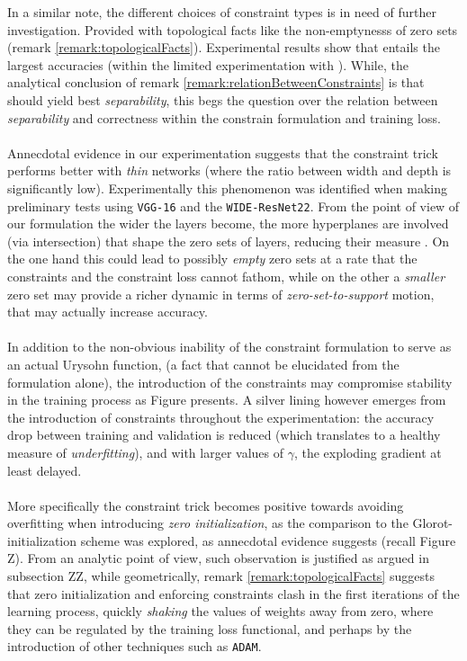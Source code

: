 In a similar note, the different choices of constraint types is in need of further investigation. Provided with topological facts like the non-emptynesss of zero sets (remark  \ref{remark:topologicalFacts}). Experimental results show that \ReLUL entails the largest accuracies (within the limited experimentation with \moons). While, the analytical conclusion of remark \ref{remark:relationBetweenConstraints} is that \ReLUU should yield best \emph{separability}, this begs the question over the relation between \emph{separability} and correctness within the constrain formulation and training loss.  
\\\\
Annecdotal evidence in our experimentation suggests that the constraint trick performs better with \emph{thin} networks (where the ratio between width and depth is significantly low). Experimentally this phenomenon was identified when making preliminary tests using \texttt{VGG-16} and the \texttt{WIDE-ResNet22}. From the point of view of our formulation the wider the layers become, the more hyperplanes are involved (via intersection) that shape the zero sets of layers, reducing their measure \cite{florenzano2001ConvexAnalysis}. On the one hand this could lead to possibly \emph{empty} zero sets at a rate that the constraints and the constraint loss cannot fathom, while on the other a \emph{smaller} zero set may provide a richer dynamic in terms of \emph{zero-set-to-support} motion, that may actually increase accuracy. 
\\\\
In addition to the non-obvious inability of the constraint formulation to serve as an actual Urysohn function, (a fact that cannot be elucidated from the formulation alone), the introduction of the constraints may compromise stability in the training process as Figure presents. A silver lining however emerges from the introduction of constraints throughout the experimentation: the accuracy drop between training and validation is reduced (which translates to a healthy measure of \emph{underfitting}), and with larger values of $\gamma$, the exploding gradient  at least delayed. 
\\\\
More specifically the constraint trick becomes positive towards avoiding overfitting when introducing  \emph{zero initialization}, as the comparison to the Glorot-initialization scheme was explored, as annecdotal evidence suggests (recall Figure Z). From an analytic point of view, such observation is justified as argued in subsection ZZ, while geometrically, remark \ref{remark:topologicalFacts} suggests that zero initialization and enforcing constraints clash in the first iterations of the learning process, quickly \emph{shaking} the values of  weights away from zero, where they can be regulated by the training loss functional, and perhaps by the introduction of other techniques such as \texttt{ADAM}.  
